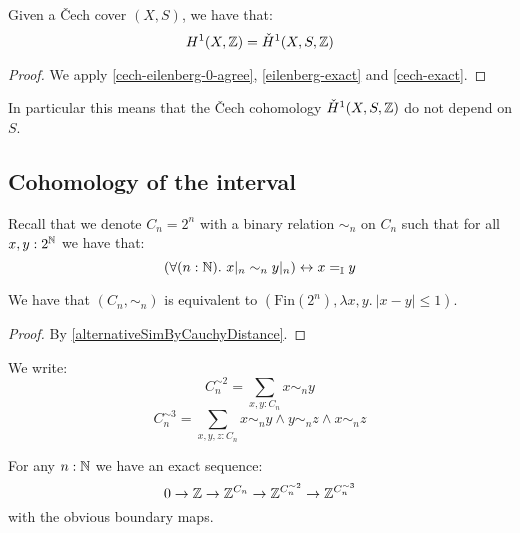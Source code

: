 \begin{theorem}\label{cech-eilenberg-1-agree}
Given a \v{C}ech cover $(X,S)$, we have that:
\[H^1(X,\mathbb{Z}) = \check{H}^1(X,S,\mathbb{Z})\]
\end{theorem}

\begin{proof}
We apply \cref{cech-eilenberg-0-agree}, \cref{eilenberg-exact} and \cref{cech-exact}.
\end{proof}

In particular this means that the \v{C}ech cohomology $\check{H}^1(X,S,\mathbb{Z})$ do not depend on $S$.


\subsection{Cohomology of the interval}

Recall that we denote $C_n=2^n$ with a binary relation $\sim_n$ on $C_n$ such that for all $x,y:2^{\mathbb{N}}$ we have that:
\[\left(\forall(n:\mathbb{N}).\ x|_n\sim_n y|_n\right) \leftrightarrow x=_{\mathbb{I}} y\]

\begin{lemma}\label{description-Cn-simn}
We have that $(C_n,\sim_n)$ is equivalent to $(\mathrm{Fin}(2^n),\lambda x,y.\ |x-y|\leq 1)$.
\end{lemma}

\begin{proof}
By \cref{alternativeSimByCauchyDistance}.
\end{proof}

We write:
\[C_n^{\sim2} = \sum_{x,y:C_n}x\sim_n y\]
\[C_n^{\sim3}  =  \sum_{x,y,z:C_n}x\sim_n y \land y\sim_n z\land x\sim_n z\]

\begin{lemma}\label{Cn-exact-sequence}
For any $n:\mathbb{N}$ we have an exact sequence:
\[0\to \mathbb{Z}\to \mathbb{Z}^{C_n} \to \mathbb{Z}^{C_n^{\sim2}} \to \mathbb{Z}^{C_n^{\sim3}}\]
with the obvious boundary maps.
\end{lemma}

